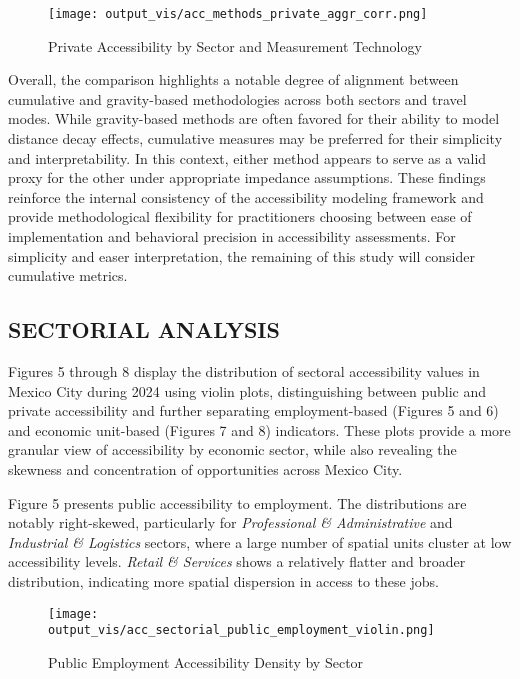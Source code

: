 \documentclass[
  12pt,
]{report}
\begin{document}
\begin{figure}[H]

{\centering \texttt{[image: output\_vis/acc\_methods\_private\_aggr\_corr.png]}

}

\caption{Private Accessibility by Sector and Measurement Technology}

\end{figure}%

Overall, the comparison highlights a notable degree of alignment between
cumulative and gravity-based methodologies across both sectors and
travel modes. While gravity-based methods are often favored for their
ability to model distance decay effects, cumulative measures may be
preferred for their simplicity and interpretability. In this context,
either method appears to serve as a valid proxy for the other under
appropriate impedance assumptions. These findings reinforce the internal
consistency of the accessibility modeling framework and provide
methodological flexibility for practitioners choosing between ease of
implementation and behavioral precision in accessibility assessments.
For simplicity and easer interpretation, the remaining of this study
will consider cumulative metrics.

\subsection{SECTORIAL ANALYSIS}\label{sectorial-analysis}

Figures 5 through 8 display the distribution of sectoral accessibility
values in Mexico City during 2024 using violin plots, distinguishing
between public and private accessibility and further separating
employment-based (Figures 5 and 6) and economic unit-based (Figures 7
and 8) indicators. These plots provide a more granular view of
accessibility by economic sector, while also revealing the skewness and
concentration of opportunities across Mexico City.

Figure 5 presents public accessibility to employment. The distributions
are notably right-skewed, particularly for \emph{Professional \&
Administrative} and \emph{Industrial \& Logistics} sectors, where a
large number of spatial units cluster at low accessibility levels.
\emph{Retail \& Services} shows a relatively flatter and broader
distribution, indicating more spatial dispersion in access to these
jobs.

\begin{figure}[H]

{\centering \texttt{[image: output\_vis/acc\_sectorial\_public\_employment\_violin.png]}

}

\caption{Public Employment Accessibility Density by Sector}

\end{figure}%
\end{document}
